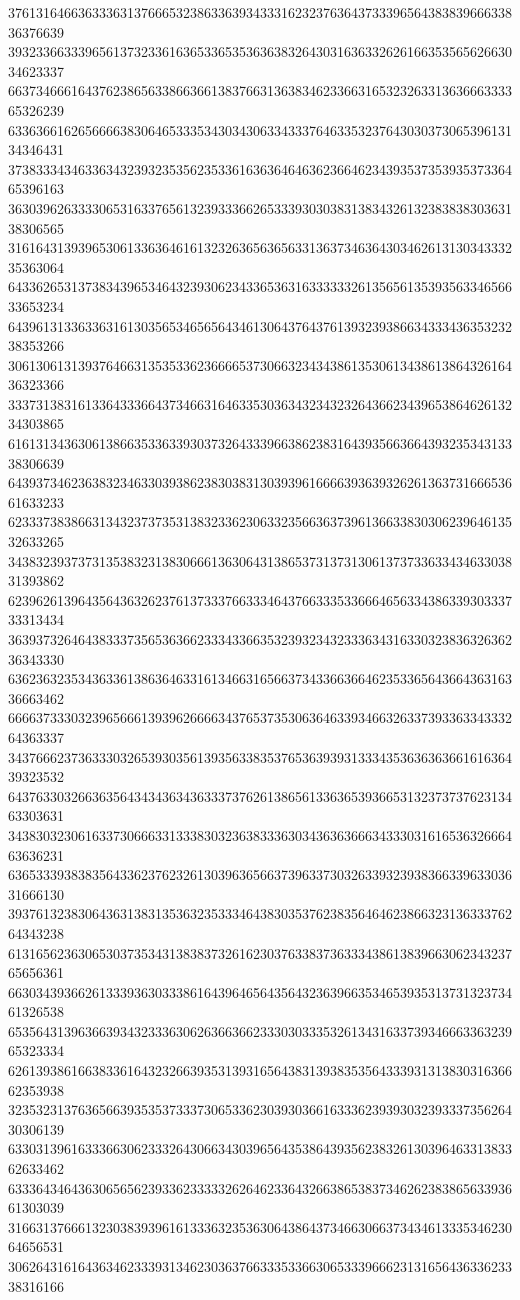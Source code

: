 37613164663633363137666532386336393433316232376364373339656438383966633836376639
39323366333965613732336163653365353636383264303163633262616635356562663034623337
66373466616437623865633866366138376631363834623366316532326331363666333365326239
63363661626566663830646533353430343063343337646335323764303037306539613134346431
37383334346336343239323535623533616363646463623664623439353735393537336465396163
36303962633330653163376561323933366265333930303831383432613238383830363138306565
31616431393965306133636461613232636563656331363734636430346261313034333235363064
64336265313738343965346432393062343365363163333332613565613539356334656633653234
64396131336336316130356534656564346130643764376139323938663433343635323238353266
30613061313937646631353533623666653730663234343861353061343861386432616436323366
33373138316133643336643734663164633530363432343232643662343965386462613234303865
61613134363061386635336339303732643339663862383164393566366439323534313338306639
64393734623638323463303938623830383130393961666639363932626136373166653661633233
62333738386631343237373531383233623063323566363739613663383030623964613532633265
34383239373731353832313830666136306431386537313731306137373363343463303831393862
62396261396435643632623761373337663334643766333533666465633438633930333733313434
36393732646438333735653636623334336635323932343233363431633032383632636236343330
63623632353436336138636463316134663165663734336636646235336564366436316336663462
66663733303239656661393962666634376537353063646339346632633739336334333264363337
34376662373633303265393035613935633835376536393931333435363636366161636439323532
64376330326636356434343634363337376261386561336365393665313237373762313463303631
34383032306163373066633133383032363833363034363636663433303161653632666463636231
63653339383835643362376232613039636566373963373032633932393836633963303631666130
39376132383064363138313536323533346438303537623835646462386632313633376264343238
61316562363065303735343138383732616230376338373633343861383966306234323765656361
66303439366261333936303338616439646564356432363966353465393531373132373461326538
65356431396366393432333630626366366233303033353261343163373934666336323965323334
62613938616638336164323266393531393165643831393835356433393131383031636662353938
32353231376365663935353733373065336230393036616333623939303239333735626430306139
63303139616333663062333264306634303965643538643935623832613039646331383362633462
63336434643630656562393362333332626462336432663865383734626238386563393661303039
31663137666132303839396161333632353630643864373466306637343461333534623064656531
30626431616436346233393134623036376633353366306533396662313165643633623338316166
